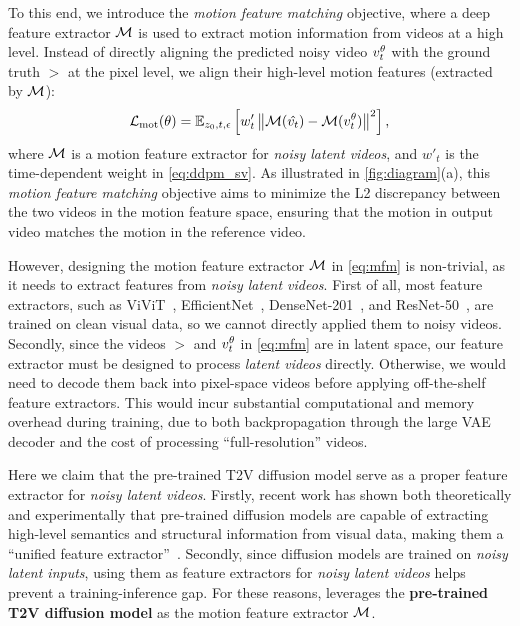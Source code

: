 To this end, we introduce the \emph{motion feature matching} objective, where a deep feature extractor ${\mathcal M}$ is used to extract motion information from videos at a high level. Instead of directly aligning the predicted noisy video $v^{\theta}_t$ with the ground truth $\gt$ at the pixel level, we align their high-level motion features (extracted by ${\mathcal M}$):
\begin{equation}
    \mathcal{L}_{\rm mot}(\theta)=\mathbb{E}_{z_0, t, \epsilon}\left[w'_t\left\|
{\mathcal M}(\hat{v_t})-{\mathcal M}(v^{\theta}_t)
\right\|^2\right],
  \label{eq:mfm}
\end{equation}
where ${\mathcal M}$ is a motion feature extractor for \emph{noisy latent videos}, and $w'_t$ is the time-dependent weight in \cref{eq:ddpm_sv}. As illustrated in \cref{fig:diagram}(a), this \emph{motion feature matching} objective aims to minimize the L2 discrepancy between the two videos in the motion feature space, ensuring that the motion in output video matches the motion in the reference video.

However, designing the motion feature extractor ${\mathcal M}$ in \cref{eq:mfm} is non-trivial, as it needs to extract features from \emph{noisy latent videos}. First of all, most feature extractors, such as ViViT~\cite{vivit}, EfficientNet~\cite{eff}, DenseNet-201~\cite{densenet}, and ResNet-50~\cite{resnet}, are trained on clean visual data, so we cannot directly applied them to noisy videos. Secondly, since the videos $\gt$ and $v^{\theta}_t$ in \cref{eq:mfm} are in latent space, our feature extractor must be designed to process \emph{latent videos} directly. Otherwise, we would need to decode them back into pixel-space videos before applying off-the-shelf feature extractors. This would incur substantial computational and memory overhead during training, due to both backpropagation through the large VAE decoder and the cost of processing ``full-resolution'' videos. 

Here we claim that the pre-trained T2V diffusion model serve as a proper feature extractor for \emph{noisy latent videos}. Firstly, recent work has shown both theoretically and experimentally that pre-trained diffusion models are capable of extracting high-level semantics and structural information from visual data, making them a ``unified feature extractor''~\cite{ins1, ins2}. Secondly, since diffusion models are trained on \emph{noisy latent inputs}, using them as feature extractors for \emph{noisy latent videos} helps prevent a training-inference gap. For these reasons, {\ours} leverages the \textbf{pre-trained T2V diffusion model} as the motion feature extractor ${\mathcal M}$.

